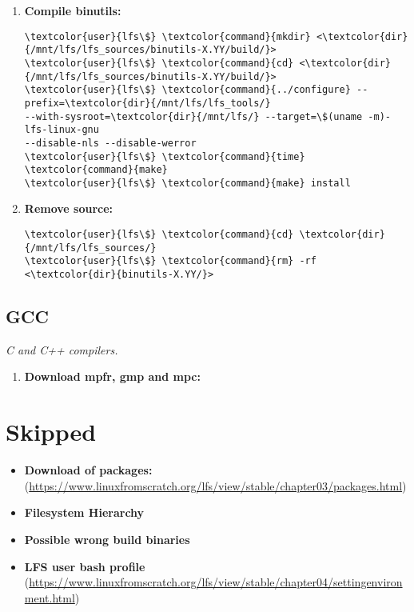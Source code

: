 \documentclass[10pt, a4paper, onecolumn, oneside, titlepage, openany]{book}
\begin{document}
\begin{enumerate}
\begin{Verbatim}[commandchars=\\\{\}]
\textcolor{user}{lfs\$} \textcolor{command}{mv} <\textcolor{file}{binutils-X.YY.tar.xz}> \textcolor{dir}{/mnt/lfs/lfs_sources/}
\textcolor{user}{lfs\$} \textcolor{command}{cd} \textcolor{dir}{/mnt/lfs/lfs_sources/}
\textcolor{user}{lfs\$} \textcolor{command}{tar} xvJf <\textcolor{file}{binutils-X.YY.tar.xz}>
\textcolor{user}{lfs\$} \textcolor{command}{rm} <\textcolor{file}{binutils-X.YY.tar.xz}>
\end{Verbatim}
    \item \textbf{Compile binutils:}
\begin{Verbatim}[commandchars=\\\{\}]
\textcolor{user}{lfs\$} \textcolor{command}{mkdir} <\textcolor{dir}{/mnt/lfs/lfs_sources/binutils-X.YY/build/}>
\textcolor{user}{lfs\$} \textcolor{command}{cd} <\textcolor{dir}{/mnt/lfs/lfs_sources/binutils-X.YY/build/}>
\textcolor{user}{lfs\$} \textcolor{command}{../configure} --prefix=\textcolor{dir}{/mnt/lfs/lfs_tools/}
--with-sysroot=\textcolor{dir}{/mnt/lfs/} --target=\$(uname -m)-lfs-linux-gnu
--disable-nls --disable-werror
\textcolor{user}{lfs\$} \textcolor{command}{time} \textcolor{command}{make}
\textcolor{user}{lfs\$} \textcolor{command}{make} install
\end{Verbatim}
    \item \textbf{Remove source:}
\begin{Verbatim}[commandchars=\\\{\}]
\textcolor{user}{lfs\$} \textcolor{command}{cd} \textcolor{dir}{/mnt/lfs/lfs_sources/}
\textcolor{user}{lfs\$} \textcolor{command}{rm} -rf <\textcolor{dir}{binutils-X.YY/}>
\end{Verbatim}
\end{enumerate}

\section{GCC}
\textit{C and C++ compilers.}
\begin{enumerate}
    \item \textbf{Download mpfr, gmp and mpc:}
\end{enumerate}



\chapter{Skipped}
\begin{itemize}
    \item \textbf{Download of packages:} (\url{https://www.linuxfromscratch.org/lfs/view/stable/chapter03/packages.html})
    \item \textbf{Filesystem Hierarchy}
    \item \textbf{Possible wrong build binaries}
    \item \textbf{LFS user bash profile} (\url{https://www.linuxfromscratch.org/lfs/view/stable/chapter04/settingenvironment.html})
\end{itemize}
\end{document}
